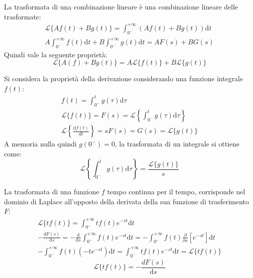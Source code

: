 \documentclass{article}
\newcommand{\df}{\mathrm{d}}
\numberwithin{equation}{subsection}
\begin{document}
La trasformata di una combinazione lineare è una combinazione lineare delle trasformate:
\begin{gather*}
    \mathcal{L}\{Af(t)+Bg(t)\}=\displaystyle\int_{0^-}^{+\infty}\left(Af(t)+Bg(t)\right)\df t\\
    A\int_{0^-}^{+\infty}f(t)\df t+B\int_{0^-}^{+\infty}g(t)\df t=AF(s)+BG(s)
\end{gather*}
Quindi vale la seguente proprietà:
\begin{equation}
    \mathcal{L}\{A(f)+Bg(t)\}=A\mathcal{L}\{f(t)\}+B\mathcal{L}\{g(t)\}
\end{equation}

Si considera la proprietà della derivazione considerando una funzione integrale $f(t)$:
\begin{gather*}
    f(t)=\displaystyle\int_{0^-}^tg(\tau)\df\tau\\
    \mathcal{L}\{f(t)\}=F(s)=\mathcal{L}\left\{\displaystyle\int_{0^-}^tg(\tau)\df\tau\right\}\\
    \mathcal{L}\left\{\displaystyle\frac{\df f(t)}{\df t}\right\}=sF(s)=G(s)=\mathcal{L}\{g(t)\}
\end{gather*}
A memoria nulla quindi $g(0^-)=0$, la trasformata di un integrale si ottiene come:
\begin{equation}
    \mathcal{L}\left\{\displaystyle\int_{0^-}^tg(\tau)\df\tau\right\}=\frac{\mathcal{L}\{g(t)\}}{s}
\end{equation}



La trasformata di una funzione $f$ tempo continua per il tempo, corrisponde nel dominio di Laplace all'opposto della derivata della sua funzione di 
trasferimento $F$:
\begin{gather*}
    \mathcal{L}\{tf(t)\}=\displaystyle\int_{0^-}^{+\infty}tf(t)e^{-st}\df t\\
    \displaystyle-\frac{dF(s)}{\df s}=-\frac{\df}{\df s}\int_{0^-}^{+\infty}f(t)e^{-st}\df t=-\int_{0^-}^{+\infty}f(t)\frac{\partial }{\partial s}\left[e^{-st}\right]\df t\\
    -\int_{0^-}^{+\infty}f(t)(-te^{-st})\df t=\int_{0^-}^{+\infty}tf(t)e^{-st}\df t=\mathcal{L}\{tf(t)\}
\end{gather*}
\begin{equation}
    \mathcal{L}\{tf(t)\}=\displaystyle-\frac{dF(s)}{\df s}
\end{equation}
\end{document}
